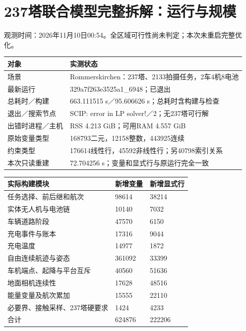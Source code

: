 \section*{237塔联合模型完整拆解：运行与规模}
观测时间：2026年11月10日00:54。全区域可行性尚未判定；本次未重启完整优化。
\begin{center}\small\begin{tabular}{p{33mm}p{130mm}}\toprule 对象 & 实测状态\\\midrule
场景 & Rommerskirchen：237塔、2133拍摄任务，2车4机8电池\\
最新运行 & 329a7f263e3525a1\_6948；已退出\\
总耗时／构建 & 663.111515 s／95.606626 s；总耗时含构建与检查\\
退出／搜索节点 & SCIP: error in LP solver!／2；无237塔可行解\\
出错时进程／主机 & RSS 4.213 GiB；可用RAM 4.557 GiB\\
原始变量类型 & 168793二元，12158整数，443925连续\\
约束类型 & 176614线性行，45592非线性行；另40798索引关系\\
本次只读重建 & 72.704256 s；变量和显式行与原运行完全一致\\
\bottomrule\end{tabular}\end{center}\begin{center}\small\begin{tabular}{p{100mm}p{28mm}p{28mm}}\toprule 实际构建模块 & 新增变量 & 新增显式行\\\midrule
任务选择、前后继和航次 & 98614 & 38214\\
实体无人机与电池链 & 10140 & 7032\\
车辆道路阶段 & 47570 & 6150\\
充电事件与账本 & 17316 & 9044\\
充电温度 & 14977 & 1872\\
自由连续航迹与姿态 & 361092 & 33399\\
车机端点、起降与平台互斥 & 40560 & 51636\\
地面相机连续性 & 17628 & 48516\\
能量变量及航次累加 & 15555 & 22110\\
必要界、接触采样、237塔硬要求 & 1424 & 4233\\
合计 & 624876 & 222206\\
\bottomrule\end{tabular}\end{center}
\clearpage
